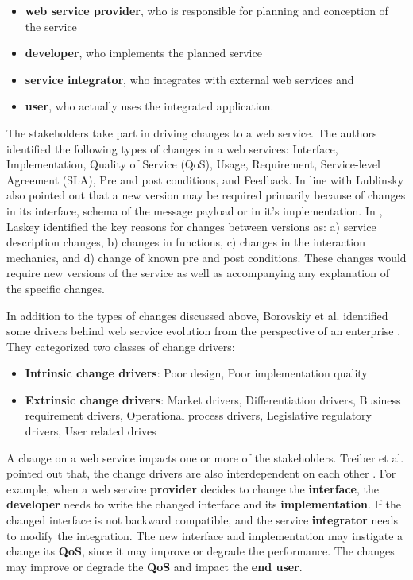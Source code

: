 \documentclass[runningheads,a4paper]{llncs}
\begin{document}
\begin{itemize}
  \item \textbf{web service provider}, who is responsible for planning and conception of the service
  \item \textbf{developer}, who implements the planned service
  \item \textbf{service integrator}, who integrates with external web services and
  \item \textbf{user}, who actually uses the integrated application.
\end{itemize}

The stakeholders take part in driving changes to a web service. The authors identified the following types of changes in a web services: Interface, Implementation, Quality of Service (QoS), Usage, Requirement, Service-level Agreement (SLA), Pre and post conditions, and Feedback. In line with \cite{treiber2009analyzing}  Lublinsky also pointed out that a new version may be required primarily because of changes in its interface, schema of the message payload or in it’s implementation. In \cite{laskey2008considerations}, Laskey identified the key reasons for changes between versions as: a) service description changes, b) changes in functions, c) changes in the interaction mechanics, and d) change of known pre and post conditions. These changes would require new versions of the service as well as accompanying any explanation of the specific changes.

In addition to the types of changes discussed above, Borovskiy et al. identified some drivers behind web service evolution from the perspective of an enterprise \cite{borovskiy2008evolution}. They categorized two classes of change drivers:

\begin{itemize}
  \item \textbf{Intrinsic change drivers}: Poor design, Poor implementation quality
  \item \textbf{Extrinsic change drivers}: Market drivers, Differentiation drivers, Business requirement drivers, Operational process drivers, Legislative regulatory drivers, User related drives
\end{itemize}


A change on a web service impacts one or more of the stakeholders. Treiber et al. pointed out that, the change drivers are also interdependent on each other \cite{treiber2009analyzing}. For example, when a web service \textbf{provider} decides to change the \textbf{interface}, the \textbf{developer} needs to write the changed interface and its \textbf{implementation}. If the changed interface is not backward compatible, and the service \textbf{integrator} needs to modify the integration. The new interface and implementation may instigate a change its \textbf{QoS}, since it may improve or degrade the performance. The changes may improve or degrade the \textbf{QoS} and impact the \textbf{end user}.
\end{document}

